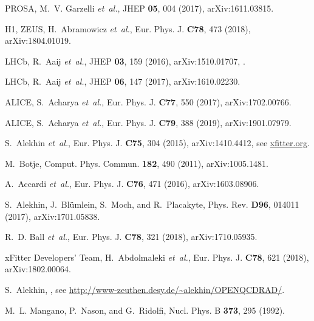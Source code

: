 \documentclass[a4paper,11pt]{article}
\begin{document}
\begin{thebibliography}{99}
PROSA, M.~V. Garzelli {\em et~al.},
\newblock JHEP {\bf 05}, 004 (2017), arXiv:1611.03815.

H1, ZEUS, H.~Abramowicz {\em et~al.},
\newblock Eur. Phys. J. {\bf C78}, 473 (2018), arXiv:1804.01019.

LHCb, R.~Aaij {\em et~al.},
\newblock JHEP {\bf 03}, 159 (2016), arXiv:1510.01707,
.

LHCb, R.~Aaij {\em et~al.},
\newblock JHEP {\bf 06}, 147 (2017), arXiv:1610.02230.

ALICE, S.~Acharya {\em et~al.},
\newblock Eur. Phys. J. {\bf C77}, 550 (2017), arXiv:1702.00766.

ALICE, S.~Acharya {\em et~al.},
\newblock Eur. Phys. J. {\bf C79}, 388 (2019), arXiv:1901.07979.

S.~Alekhin {\em et~al.},
\newblock Eur. Phys. J. {\bf C75}, 304 (2015), arXiv:1410.4412,
\newblock see \url{xfitter.org}.

M.~Botje,
\newblock Comput. Phys. Commun. {\bf 182}, 490 (2011), arXiv:1005.1481.

A.~Accardi {\em et~al.},
\newblock Eur. Phys. J. {\bf C76}, 471 (2016), arXiv:1603.08906.

S.~Alekhin, J.~Bl{\"u}mlein, S.~Moch, and R.~Placakyte,
\newblock Phys. Rev. {\bf D96}, 014011 (2017), arXiv:1701.05838.

R.~D. Ball {\em et~al.},
\newblock Eur. Phys. J. {\bf C78}, 321 (2018), arXiv:1710.05935.

xFitter Developers' Team, H.~Abdolmaleki {\em et~al.},
\newblock Eur. Phys. J. {\bf C78}, 621 (2018), arXiv:1802.00064.

S.~Alekhin,
,
\newblock see \url{http://www-zeuthen.desy.de/~alekhin/OPENQCDRAD/}.

M.~L. Mangano, P.~Nason, and G.~Ridolfi,
\newblock Nucl. Phys. B {\bf 373}, 295 (1992).


\end{thebibliography}
\end{document}
